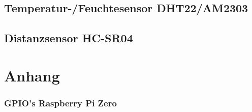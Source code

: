 

\clearpage
\section{Temperatur-/Feuchtesensor DHT22/AM2303}



\clearpage
\section{Distanzsensor HC-SR04}




\chapter*{Anhang}


\subsection*{GPIO's Raspberry Pi Zero}

